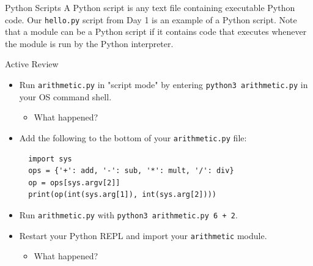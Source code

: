 \documentclass[smaller, aspectratio=1610]{beamer}
\begin{document}
\begin{frame}[label={sec:orgdfffaaa},fragile]{Python Scripts}
 A Python script is any text file containing executable Python code.  Our \texttt{hello.py} script from Day 1 is an example of a Python script.  Note that a module can be a Python script if it contains code that executes whenever the module is run by the Python interpreter.

\begin{block}{Active Review}
\begin{itemize}
\item Run \texttt{arithmetic.py} in "script mode" by entering \texttt{python3 arithmetic.py} in your OS command shell.
\begin{itemize}
\item What happened?
\end{itemize}
\item Add the following to the bottom of your \texttt{arithmetic.py} file:

\lstset{language=Python,label= ,caption= ,captionpos=b,numbers=none}
\begin{lstlisting}
  import sys
  ops = {'+': add, '-': sub, '*': mult, '/': div}
  op = ops[sys.argv[2]]
  print(op(int(sys.arg[1]), int(sys.arg[2])))
\end{lstlisting}

\item Run \texttt{arithmetic.py} with \texttt{python3 arithmetic.py 6 + 2}.
\item Restart your Python REPL and import your \texttt{arithmetic} module.
\begin{itemize}
\item What happened?
\end{itemize}
\end{itemize}
\end{block}
\end{frame}
\end{document}
